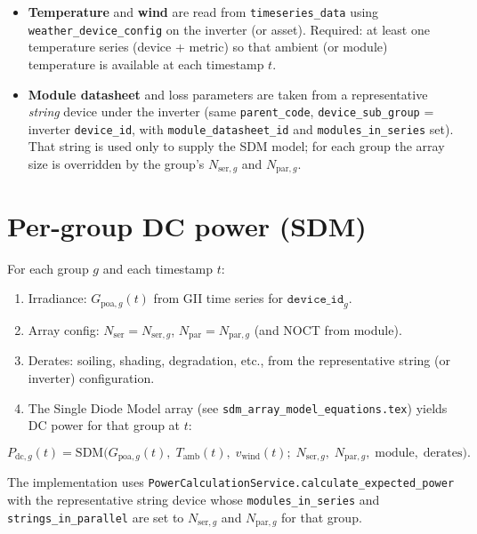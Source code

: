 \documentclass[11pt,a4paper]{article}
\begin{document}
\begin{itemize}
  \item \textbf{Temperature} and \textbf{wind} are read from \texttt{timeseries\_data} using \texttt{weather\_device\_config} on the inverter (or asset). Required: at least one temperature series (device + metric) so that ambient (or module) temperature is available at each timestamp \(t\).
  \item \textbf{Module datasheet} and loss parameters are taken from a representative \emph{string} device under the inverter (same \texttt{parent\_code}, \texttt{device\_sub\_group} = inverter \texttt{device\_id}, with \texttt{module\_datasheet\_id} and \texttt{modules\_in\_series} set). That string is used only to supply the SDM model; for each group the array size is overridden by the group's \(N_{\mathrm{ser},g}\) and \(N_{\mathrm{par},g}\).
\end{itemize}

\section{Per-group DC power (SDM)}

For each group \(g\) and each timestamp \(t\):

\begin{enumerate}
  \item Irradiance: \(G_{\mathrm{poa},g}(t)\) from GII time series for \(\mathtt{device\_id}_g\).
  \item Array config: \(N_{\mathrm{ser}} = N_{\mathrm{ser},g}\), \(N_{\mathrm{par}} = N_{\mathrm{par},g}\) (and NOCT from module).
  \item Derates: soiling, shading, degradation, etc., from the representative string (or inverter) configuration.
  \item The Single Diode Model array (see \texttt{sdm\_array\_model\_equations.tex}) yields DC power for that group at \(t\):
\end{enumerate}

\begin{equation}
  P_{\mathrm{dc},g}(t) = \text{SDM}\bigl(G_{\mathrm{poa},g}(t),\; T_{\mathrm{amb}}(t),\; v_{\mathrm{wind}}(t);\; N_{\mathrm{ser},g},\; N_{\mathrm{par},g},\; \text{module},\; \text{derates}\bigr).
\end{equation}

The implementation uses \texttt{PowerCalculationService.calculate\_expected\_power} with the representative string device whose \texttt{modules\_in\_series} and \texttt{strings\_in\_parallel} are set to \(N_{\mathrm{ser},g}\) and \(N_{\mathrm{par},g}\) for that group.
\end{document}
